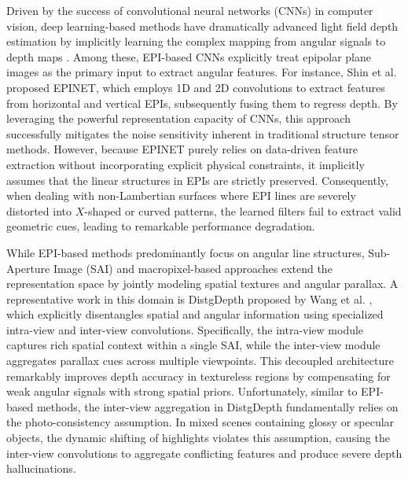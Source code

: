 \documentclass[lettersize,journal]{IEEEtran}
\begin{document}
Driven by the success of convolutional neural networks (CNNs) in computer vision, deep learning-based methods have dramatically advanced light field depth estimation by implicitly learning the complex mapping from angular signals to depth maps \cite{deeplearninglightfielddept}. Among these, EPI-based CNNs explicitly treat epipolar plane images as the primary input to extract angular features. For instance, Shin et al. \cite{ShinEPINET} proposed EPINET, which employs 1D and 2D convolutions to extract features from horizontal and vertical EPIs, subsequently fusing them to regress depth. By leveraging the powerful representation capacity of CNNs, this approach successfully mitigates the noise sensitivity inherent in traditional structure tensor methods. However, because EPINET purely relies on data-driven feature extraction without incorporating explicit physical constraints, it implicitly assumes that the linear structures in EPIs are strictly preserved. Consequently, when dealing with non-Lambertian surfaces where EPI lines are severely distorted into $X$-shaped or curved patterns, the learned filters fail to extract valid geometric cues, leading to remarkable performance degradation.

While EPI-based methods predominantly focus on angular line structures, Sub-Aperture Image (SAI) and macropixel-based approaches extend the representation space by jointly modeling spatial textures and angular parallax. A representative work in this domain is DistgDepth proposed by Wang et al. \cite{WangDistgDepth}, which explicitly disentangles spatial and angular information using specialized intra-view and inter-view convolutions. Specifically, the intra-view module captures rich spatial context within a single SAI, while the inter-view module aggregates parallax cues across multiple viewpoints. This decoupled architecture remarkably improves depth accuracy in textureless regions by compensating for weak angular signals with strong spatial priors. Unfortunately, similar to EPI-based methods, the inter-view aggregation in DistgDepth fundamentally relies on the photo-consistency assumption. In mixed scenes containing glossy or specular objects, the dynamic shifting of highlights violates this assumption, causing the inter-view convolutions to aggregate conflicting features and produce severe depth hallucinations.
\end{document}
